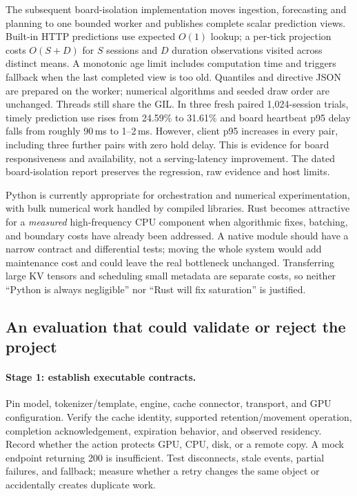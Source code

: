 The subsequent board-isolation implementation moves ingestion, forecasting and
planning to one bounded worker and publishes complete scalar prediction views.
Built-in HTTP predictions use expected $O(1)$ lookup; a per-tick projection costs
$O(S+D)$ for $S$ sessions and $D$ duration observations visited across distinct
means. A monotonic age limit includes computation time and triggers fallback
when the last completed view is too old. Quantiles and directive JSON are
prepared on the worker; numerical algorithms and seeded draw order are unchanged.
Threads still share the GIL. In three fresh paired 1,024-session trials, timely
prediction use rises from 24.59\% to 31.61\% and board heartbeat p95 delay falls
from roughly 90\,ms to 1--2\,ms. However, client p95 increases in every pair,
including three further pairs with zero hold delay. This is evidence for board
responsiveness and availability, not a serving-latency improvement. The dated
board-isolation report preserves the regression, raw evidence and host limits.

Python is currently appropriate for orchestration and numerical experimentation,
with bulk numerical work handled by compiled libraries. Rust becomes attractive
for a \emph{measured} high-frequency CPU component when algorithmic fixes,
batching, and boundary costs have already been addressed. A native module should
have a narrow contract and differential tests; moving the whole system would
add maintenance cost and could leave the real bottleneck unchanged. Transferring
large KV tensors and scheduling small metadata are separate costs, so neither
``Python is always negligible'' nor ``Rust will fix saturation'' is justified.

\subsection{An evaluation that could validate or reject the project}
\paragraph{Stage 1: establish executable contracts.}
Pin model, tokenizer/template, engine, cache connector, transport, and GPU
configuration. Verify the cache identity, supported retention/movement
operation, completion acknowledgement, expiration behavior, and observed
residency. Record whether the action protects GPU, CPU, disk, or a remote copy.
A mock endpoint returning 200 is insufficient. Test disconnects, stale events,
partial failures, and fallback; measure whether a retry changes the same object
or accidentally creates duplicate work.

